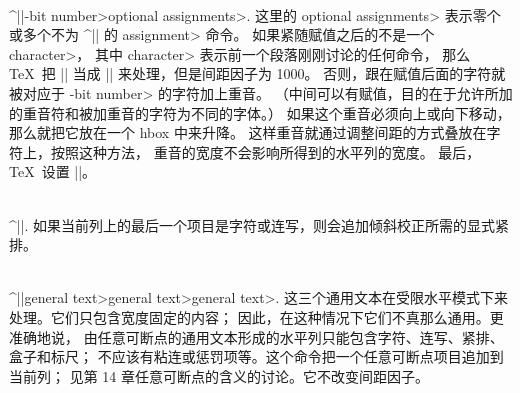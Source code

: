 \\^|\accent|-bit number>\<optional assignments>.
这里的 \<optional assignments> 表示零个或多个不为 ^|\setbox| 的 \<assignment> 命令。
如果紧随赋值之后的不是一个 \<character>，
其中 \<character> 表示前一个段落刚刚讨论的任何命令，
那么 \TeX\ 把 |\accent| 当成 |\char| 来处理，但是间距因子为 1000。
\1否则，跟在赋值后面的字符就被对应于 -bit number> 的字符加上重音。%
（中间可以有赋值，目的在于允许所加的重音符和被加重音的字符为不同的字体。）
如果这个重音必须向上或向下移动，那么就把它放在一个 hbox 中来升降。
这样重音就通过调整间距的方式叠放在字符上，按照这种方法，
重音的宽度不会影响所得到的水平列的宽度。
最后，\TeX\ 设置 ||。

\\^|\/|.\enskip
如果当前列上的最后一个项目是字符或连写，则会追加倾斜校正所需的显式紧排。

\\^|\discretionary|\<general text>\<general text>\<general text>.\enskip
这三个通用文本在受限水平模式下来处理。它们只包含宽度固定的内容；
因此，在这种情况下它们不真那么通用。更准确地说，
由任意可断点的通用文本形成的水平列只能包含字符、连写、紧排、盒子和标尺；
不应该有粘连或惩罚项等。这个命令把一个任意可断点项目追加到当前列；
见第 14 章任意可断点的含义的讨论。它不改变间距因子。

